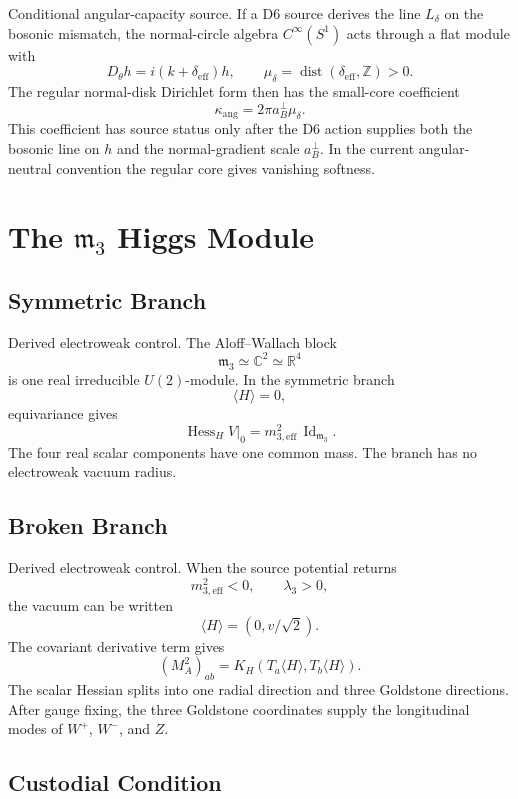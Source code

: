 \documentclass[11pt]{article}
\newcommand{\RR}{\mathbb{R}}
\newcommand{\CC}{\mathbb{C}}
\newcommand{\Id}{\operatorname{Id}}
\newcommand{\mthree}{\mathfrak m_3}
\begin{document}
Conditional angular-capacity source.  If a D6 source derives the line
\(L_\delta\) on the bosonic mismatch, the normal-circle algebra
\(C^\infty(S^1)\) acts through a flat module with
\[
  D_\theta h=i(k+\delta_{\mathrm{eff}})h,\qquad
  \mu_\delta=\operatorname{dist}(\delta_{\mathrm{eff}},\mathbb Z)>0 .
\]
The regular normal-disk Dirichlet form then has the small-core coefficient
\[
  \kappa_{\mathrm{ang}}
    =2\pi a_B^\perp\mu_\delta .
\]
This coefficient has source status only after the D6 action supplies both
the bosonic line on \(h\) and the normal-gradient scale \(a_B^\perp\).  In
the current angular-neutral convention the regular core gives vanishing
softness.

\section{The \texorpdfstring{\(\mthree\)}{m3} Higgs Module}

\subsection{Symmetric Branch}

Derived electroweak control.  The Aloff--Wallach block
\[
  \mthree\simeq \CC^2\simeq \RR^4
\]
is one real irreducible \(U(2)\)-module.  In the symmetric branch
\[
  \langle H\rangle=0,
\]
equivariance gives
\[
  \operatorname{Hess}_H V\big|_0=m_{3,\mathrm{eff}}^2\,\Id_{\mthree}.
\]
The four real scalar components have one common mass.  The branch has no
electroweak vacuum radius.

\subsection{Broken Branch}

Derived electroweak control.  When the source potential returns
\[
  m_{3,\mathrm{eff}}^2<0,\qquad \lambda_3>0,
\]
the vacuum can be written
\[
  \langle H\rangle=(0,v/\sqrt 2).
\]
The covariant derivative term gives
\[
  (M_A^2)_{ab}=K_H(T_a\langle H\rangle,T_b\langle H\rangle).
\]
The scalar Hessian splits into one radial direction and three Goldstone
directions.  After gauge fixing, the three Goldstone coordinates supply the
longitudinal modes of \(W^+\), \(W^-\), and \(Z\).

\subsection{Custodial Condition}
\end{document}
